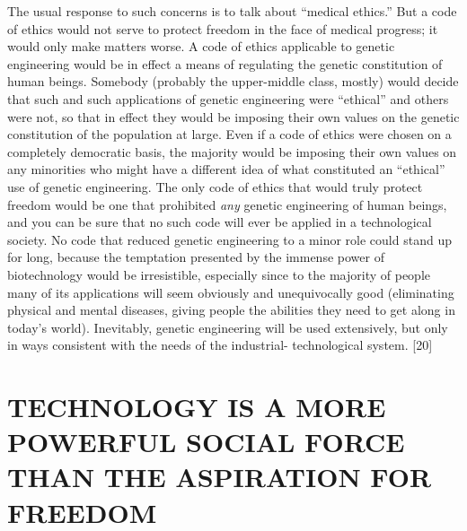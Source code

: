  The usual response to such concerns is to talk about “medical ethics.” But a code of ethics would not serve to protect freedom in the face of medical progress; it would only make matters worse. A code of ethics applicable to genetic engineering would be in effect a means of regulating the genetic constitution of human beings. Somebody (probably the upper-middle class, mostly) would decide that such and such applications of genetic engineering were “ethical” and others were not, so that in effect they would be imposing their own values on the genetic constitution of the population at large. Even if a code of ethics were chosen on a completely democratic basis, the majority would be imposing their own values on any minorities who might have a different idea of what constituted an “ethical” use of genetic engineering. The only code of ethics that would truly protect freedom would be one that prohibited {\em any} genetic engineering of human beings, and you can be sure that no such code will ever be applied in a technological society. No code that reduced genetic engineering to a minor role could stand up for long, because the temptation presented by the immense power of biotechnology would be irresistible, especially since to the majority of people many of its applications will seem obviously and unequivocally good (eliminating physical and mental diseases, giving people the abilities they need to get along in today’s world). Inevitably, genetic engineering will be used extensively, but only in ways consistent with the needs of the industrial- technological system. [20]

\chapter{TECHNOLOGY IS A MORE POWERFUL SOCIAL FORCE THAN THE ASPIRATION FOR FREEDOM}

